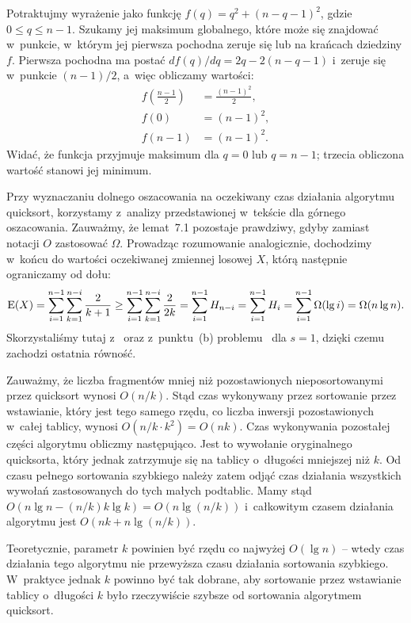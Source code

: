 \exercise %
Potraktujmy wyrażenie jako funkcję $f(q)=q^2+(n-q-1)^2$, gdzie $0\le q\le n-1$. Szukamy jej maksimum globalnego, które może się znajdować w~punkcie, w~którym jej pierwsza pochodna zeruje się lub na krańcach dziedziny $f$. Pierwsza pochodna ma postać $df(q)/dq=2q-2(n-q-1)$ i~zeruje się w~punkcie $(n-1)/2$, a~więc obliczamy wartości:
\begin{align*}
	f\left(\frac{n-1}{2}\right) &= \frac{(n-1)^2}{2}, \\
	f(0) &= (n-1)^2, \\
	f(n-1) &= (n-1)^2.
\end{align*}
Widać, że funkcja przyjmuje maksimum dla $q=0$ lub $q=n-1$; trzecia obliczona wartość stanowi jej minimum.

\exercise %
Przy wyznaczaniu dolnego oszacowania na oczekiwany czas działania algorytmu quicksort, korzystamy z~analizy przedstawionej w~tekście dla górnego oszacowania. Zauważmy, że lemat~7.1 pozostaje prawdziwy, gdyby zamiast notacji $O$ zastosować $\Omega$. Prowadząc rozumowanie analogicznie, dochodzimy w~końcu do wartości oczekiwanej zmiennej losowej $X$, którą następnie ograniczamy od dołu:
\[
	\operatorname{E}(X) = \sum_{i=1}^{n-1}\sum_{k=1}^{n-i}\frac{2}{k+1} \ge \sum_{i=1}^{n-1}\sum_{k=1}^{n-i}\frac{2}{2k} = \sum_{i=1}^{n-1}H_{n-i} = \sum_{i=1}^{n-1}H_i = \sum_{i=1}^{n-1}\Omega(\lg i) = \Omega(n\lg n).
\]
Skorzystaliśmy tutaj z~ oraz z~punktu~(b) problemu~ dla $s=1$, dzięki czemu zachodzi ostatnia równość.

\exercise %
Zauważmy, że liczba fragmentów mniej niż  pozostawionych nieposortowanymi przez quicksort wynosi $O(n/k)$. Stąd czas wykonywany przez sortowanie przez wstawianie, który jest tego samego rzędu, co liczba inwersji pozostawionych w~całej tablicy, wynosi $O(n/k\cdot k^2)=O(nk)$. Czas wykonywania pozostałej części algorytmu obliczmy następująco. Jest to wywołanie oryginalnego quicksorta, który jednak zatrzymuje się na tablicy o~długości mniejszej niż $k$. Od czasu pełnego sortowania szybkiego należy zatem odjąć czas działania wszystkich wywołań zastosowanych do tych małych podtablic. Mamy stąd $O(n\lg n-(n/k)k\lg k)=O(n\lg(n/k))$ i~całkowitym czasem działania algorytmu jest $O(nk+n\lg(n/k))$.

Teoretycznie, parametr $k$ powinien być rzędu co najwyżej $O(\lg n)$ -- wtedy czas działania tego algorytmu nie przewyższa czasu działania sortowania szybkiego. W~praktyce jednak $k$ powinno być tak dobrane, aby sortowanie przez wstawianie tablicy o~długości $k$ było rzeczywiście szybsze od sortowania algorytmem quicksort.

